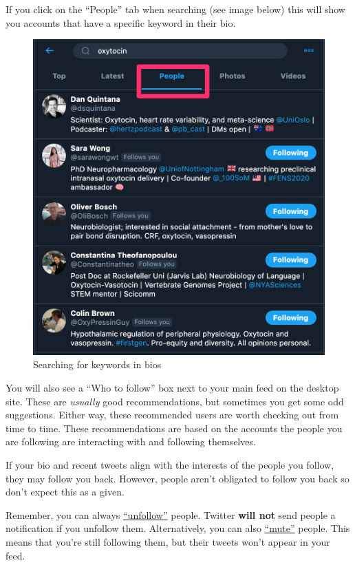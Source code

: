 \documentclass[
]{book}
\begin{document}
If you click on the ``People'' tab when searching (see image below) this will show you accounts that have a specific keyword in their bio.

\begin{figure}

\includegraphics[width=0.8\linewidth]{images/bio_search} \hfill{}

\caption{Searching for keywords in bios}\label{fig:unnamed-chunk-10}
\end{figure}

You will also see a ``Who to follow'' box next to your main feed on the desktop site. These are \emph{usually} good recommendations, but sometimes you get some odd suggestions. Either way, these recommended users are worth checking out from time to time. These recommendations are based on the accounts the people you are following are interacting with and following themselves.

If your bio and recent tweets align with the interests of the people you follow, they may follow you back. However, people aren't obligated to follow you back so don't expect this as a given.

Remember, you can always \href{https://help.twitter.com/en/using-twitter/how-to-unfollow-on-twitter}{``unfollow''} people. Twitter \textbf{will not} send people a notification if you unfollow them. Alternatively, you can also \href{https://help.twitter.com/en/using-twitter/twitter-mute}{``mute''} people. This means that you're still following them, but their tweets won't appear in your feed.
\end{document}
